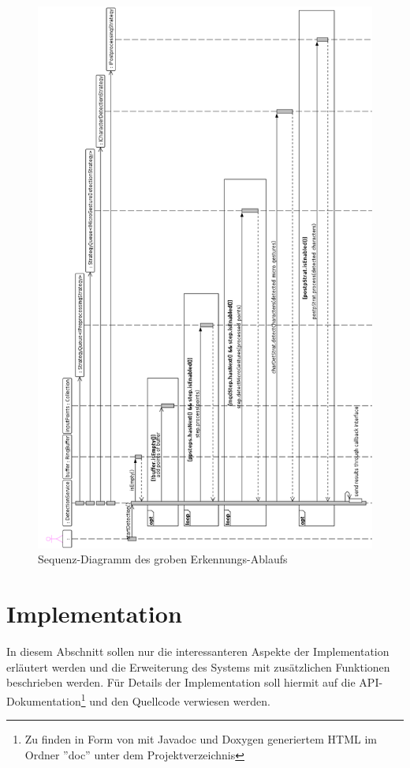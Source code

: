 \begin{figure}[bh!]
   \centering
   \includegraphics[scale=0.45]{img/uml_sd_detection} 
   \caption{Sequenz-Diagramm des groben Erkennungs-Ablaufs}
   \label{fig:sd_detection}
\end{figure}

\section{Implementation}

In diesem Abschnitt sollen nur die interessanteren Aspekte der Implementation erläutert werden und die Erweiterung des Systems mit zusätzlichen Funktionen beschrieben werden. Für Details der Implementation soll hiermit auf die API-Dokumentation\footnote{Zu finden in Form von mit Javadoc und Doxygen generiertem HTML im Ordner ''doc'' unter dem Projektverzeichnis} und den Quellcode verwiesen werden.

